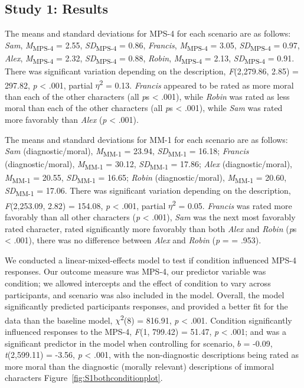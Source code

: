 \documentclass[
  english,
  man,floatsintext]{apa7}
\begin{document}
\hypertarget{study-1-results}{%
\subsection{Study 1: Results}\label{study-1-results}}

The means and standard deviations for MPS-4 for each scenario are as follows:
\emph{Sam},
\emph{M}\textsubscript{MPS-4} = 2.55, \emph{SD}\textsubscript{MPS-4} = 0.86,
\emph{Francis},
\emph{M}\textsubscript{MPS-4} = 3.05, \emph{SD}\textsubscript{MPS-4} = 0.97,
\emph{Alex},
\emph{M}\textsubscript{MPS-4} = 2.32, \emph{SD}\textsubscript{MPS-4} = 0.88,
\emph{Robin},
\emph{M}\textsubscript{MPS-4} = 2.13, \emph{SD}\textsubscript{MPS-4} = 0.91. There was significant variation depending on the description, \emph{F}(2,279.86, 2.85) = 297.82, \emph{p} \textless{} .001, partial \(\eta\)\textsuperscript{2} = 0.13. \emph{Francis} appeared to be rated as more moral than each of the other characters (all \emph{p}s \textless{} .001), while \emph{Robin} was rated as less moral than each of the other characters (all \emph{p}s \textless{} .001), while \emph{Sam} was rated more favorably than \emph{Alex} (\emph{p} \textless{} .001).

The means and standard deviations for MM-1 for each scenario are as follows:
\emph{Sam} (diagnostic/moral),
\emph{M}\textsubscript{MM-1} = 23.94, \emph{SD}\textsubscript{MM-1} = 16.18;
\emph{Francis} (diagnostic/moral),
\emph{M}\textsubscript{MM-1} = 30.12, \emph{SD}\textsubscript{MM-1} = 17.86;
\emph{Alex} (diagnostic/moral),
\emph{M}\textsubscript{MM-1} = 20.55, \emph{SD}\textsubscript{MM-1} = 16.65;
\emph{Robin} (diagnostic/moral),
\emph{M}\textsubscript{MM-1} = 20.60, \emph{SD}\textsubscript{MM-1} = 17.06. There was significant variation depending on the description, \emph{F}(2,253.09, 2.82) = 154.08, \emph{p} \textless{} .001, partial \(\eta\)\textsuperscript{2} = 0.05. \emph{Francis} was rated more favorably than all other characters (\emph{p} \textless{} .001), \emph{Sam} was the next most favorably rated character, rated significantly more favorably than both \emph{Alex} and \emph{Robin} (\emph{p}s \textless{} .001), there was no difference between \emph{Alex} and \emph{Robin} (\emph{p} = = .953).

We conducted a linear-mixed-effects model to test if condition influenced MPS-4 responses. Our outcome measure was MPS-4, our predictor variable was condition; we allowed intercepts and the effect of condition to vary across participants, and scenario was also included in the model.
Overall, the model significantly predicted participants responses, and provided a better fit for the data than the baseline model, \(\chi\)\textsuperscript{2}(8) = 816.91, \emph{p} \textless{} .001. Condition significantly influenced responses to the MPS-4, \emph{F}(1, 799.42) = 51.47, \emph{p} \textless{} .001; and was a significant predictor in the model when controlling for scenario, \(b\) = -0.09, \emph{t}(2,599.11) = -3.56, \emph{p} \textless{} .001, with the non-diagnostic descriptions being rated as more moral than the diagnostic (morally relevant) descriptions of immoral characters Figure~\ref{fig:S1bothconditionplot}.
\end{document}
